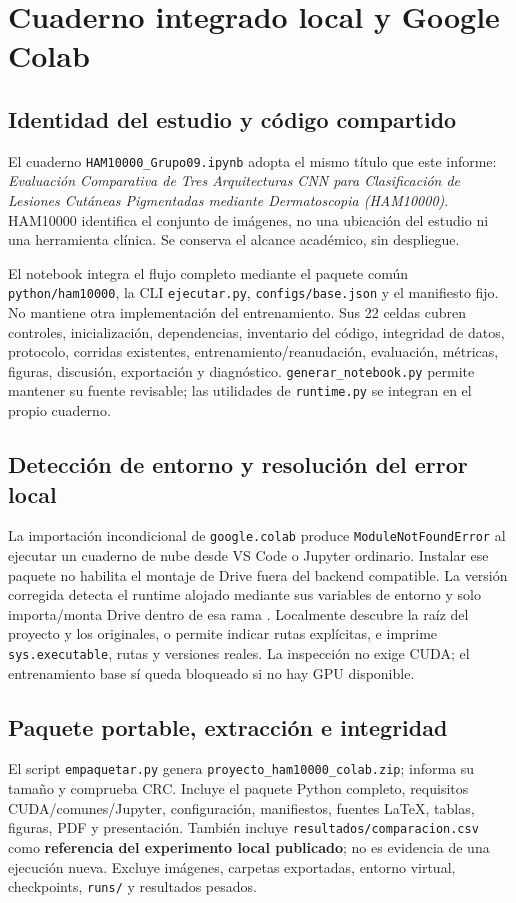 \FloatBarrier\section{Cuaderno integrado local y Google Colab}

\subsection{Identidad del estudio y código compartido}
El cuaderno \texttt{HAM10000\_Grupo09.ipynb} adopta el mismo título que este informe: \textit{Evaluación Comparativa de Tres Arquitecturas CNN para Clasificación de Lesiones Cutáneas Pigmentadas mediante Dermatoscopia (HAM10000)}. HAM10000 identifica el conjunto de imágenes, no una ubicación del estudio ni una herramienta clínica. Se conserva el alcance académico, sin despliegue.

El notebook integra el flujo completo mediante el paquete común \texttt{python/ham10000}, la CLI \texttt{ejecutar.py}, \texttt{configs/base.json} y el manifiesto fijo. No mantiene otra implementación del entrenamiento. Sus 22 celdas cubren controles, inicialización, dependencias, inventario del código, integridad de datos, protocolo, corridas existentes, entrenamiento/reanudación, evaluación, métricas, figuras, discusión, exportación y diagnóstico. \texttt{generar\_notebook.py} permite mantener su fuente revisable; las utilidades de \texttt{runtime.py} se integran en el propio cuaderno.

\subsection{Detección de entorno y resolución del error local}
La importación incondicional de \texttt{google.colab} produce \texttt{ModuleNotFoundError} al ejecutar un cuaderno de nube desde VS Code o Jupyter ordinario. Instalar ese paquete no habilita el montaje de Drive fuera del backend compatible. La versión corregida detecta el runtime alojado mediante sus variables de entorno y solo importa/monta Drive dentro de esa rama \cite{colabfaq}. Localmente descubre la raíz del proyecto y los originales, o permite indicar rutas explícitas, e imprime \texttt{sys.executable}, rutas y versiones reales. La inspección no exige CUDA; el entrenamiento base sí queda bloqueado si no hay GPU disponible.

\subsection{Paquete portable, extracción e integridad}
El script \texttt{empaquetar.py} genera \texttt{proyecto\_ham10000\_colab.zip}; informa su tamaño y comprueba CRC. Incluye el paquete Python completo, requisitos CUDA/comunes/Jupyter, configuración, manifiestos, fuentes LaTeX, tablas, figuras, PDF y presentación. También incluye \texttt{resultados/comparacion.csv} como \textbf{referencia del experimento local publicado}; no es evidencia de una ejecución nueva. Excluye imágenes, carpetas exportadas, entorno virtual, checkpoints, \texttt{runs/} y resultados pesados.

